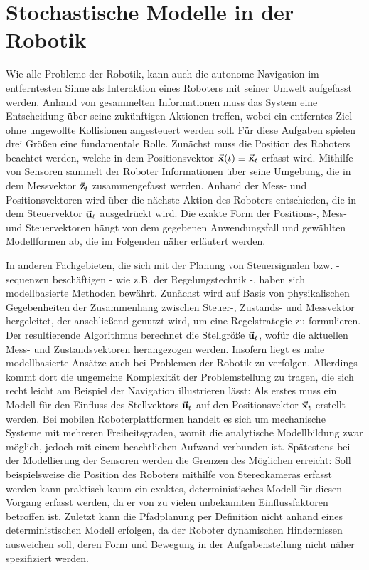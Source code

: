 \chapter{Stochastische Modelle in der Robotik}
Wie alle Probleme der Robotik, kann auch die autonome Navigation im entferntesten Sinne als Interaktion eines Roboters mit seiner Umwelt aufgefasst werden. Anhand von gesammelten Informationen muss das System eine Entscheidung über seine zukünftigen Aktionen treffen, wobei ein entferntes Ziel ohne ungewollte Kollisionen angesteuert werden soll. Für diese Aufgaben spielen drei Größen eine fundamentale Rolle. Zunächst muss die Position des Roboters beachtet werden, welche in dem Positionsvektor $\vec{\mathbf{x}}(t) \equiv \vec{\mathbf{x}}_t$ erfasst wird. Mithilfe von Sensoren sammelt der Roboter Informationen über seine Umgebung, die in dem Messvektor $\vec{\mathbf{z}}_t$ zusammengefasst werden. Anhand der Mess- und Positionsvektoren wird über die nächste Aktion des Roboters entschieden, die in dem Steuervektor $\vec{\mathbf{u}}_t$ ausgedrückt wird. Die exakte Form der Positions-, Mess- und Steuervektoren hängt von dem gegebenen Anwendungsfall und gewählten Modellformen ab, die im Folgenden näher erläutert werden.

In anderen Fachgebieten, die sich mit der Planung von Steuersignalen bzw. -sequenzen beschäftigen - wie z.B. der Regelungstechnik -, haben sich modellbasierte Methoden bewährt. Zunächst wird auf Basis von physikalischen Gegebenheiten der Zusammenhang zwischen Steuer-, Zustands- und Messvektor hergeleitet, der anschließend genutzt wird, um eine Regelstrategie zu formulieren. Der resultierende Algorithmus berechnet die Stellgröße $\vec{\mathbf{u}}_t$, wofür die aktuellen Mess- und Zustandsvektoren herangezogen werden. Insofern liegt es nahe modellbasierte Ansätze auch bei Problemen der Robotik zu verfolgen. Allerdings kommt dort die ungemeine Komplexität der Problemstellung zu tragen, die sich recht leicht am Beispiel der Navigation illustrieren lässt: Als erstes muss ein Modell für den Einfluss des Stellvektors $\vec{\mathbf{u}}_t$ auf den Positionsvektor $\vec{\mathbf{x}}_t$ erstellt werden. Bei mobilen Roboterplattformen handelt es sich um mechanische Systeme mit mehreren Freiheitsgraden, womit die analytische Modellbildung zwar möglich, jedoch mit einem beachtlichen Aufwand verbunden ist. Spätestens bei der Modellierung der Sensoren werden die Grenzen des Möglichen erreicht: Soll beispielsweise die Position des Roboters mithilfe von Stereokameras erfasst werden kann praktisch kaum ein exaktes, deterministisches Modell für diesen Vorgang erfasst werden, da er von zu vielen unbekannten Einflussfaktoren betroffen ist. Zuletzt kann die Pfadplanung per Definition nicht anhand eines deterministischen Modell erfolgen, da der Roboter dynamischen Hindernissen ausweichen soll, deren Form und Bewegung in der Aufgabenstellung nicht näher spezifiziert werden.

